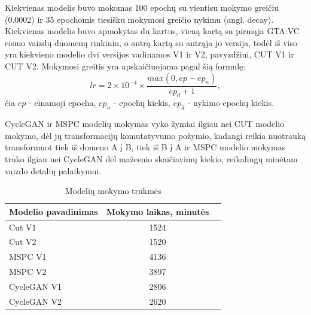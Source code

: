 \documentclass{VUMIFPSkursinis}
\begin{document}
            Kiekvienas modelis buvo mokomas 100 epochų su vientisu mokymo greičiu (0.0002) ir 35 epochomis tiesišku mokymosi greičio nykimu (angl. decay).  Kiekvienas modelis buvo apmokytas du kartus, vieną kartą su pirmąja GTA:VC eismo vaizdų duomenų rinkiniu, o antrą kartą su antrąja jo versija, todėl iš viso yra kiekvieno modelio dvi versijos vadinamos V1 ir V2, pavyzdžiui, CUT V1 ir CUT V2. Mokymosi greitis yra apskaičiuojama pagal šią formulę:
            \[ lr = 2\times10^{-4} \times \frac{ max(0, ep - ep_n)}{ep_d + 1},\] čia $ep$ - einamoji epocha, $ep_{n}$ - epochų kiekis, $ep_{d}$ - nykimo epochų kiekis.

            CycleGAN ir MSPC modelių mokymas vyko žymiai ilgiau nei CUT modelio mokymo, dėl jų transformacijų komutatyvumo požymio, kadangi reikia nuotrauką transformuot tiek iš domeno A į B, tiek iš B į A ir MSPC modelio mokymas truko ilgiau nei CycleGAN dėl mažesnio skaičiavimų kiekio, reikalingų minėtam vaizdo detalių palaikymui.
            \begin{table}[H]\footnotesize
              \centering
              \caption{Modelių mokymo trukmės}
              {\begin{tabular}{|l|c|c|} \hline
                Modelio pavadinimas & Mokymo laikas, minutės\\
                \hline
                Cut V1 & 1524 \\
                Cut V2 & 1520 \\ 
                MSPC V1 & 4136 \\
                MSPC V2 & 3897 \\
                CycleGAN V1 & 2806 \\
                CycleGAN V2 & 2620 \\
                \hline
              \end{tabular}}
              \label{tab:table example}
            \end{table}
\end{document}
